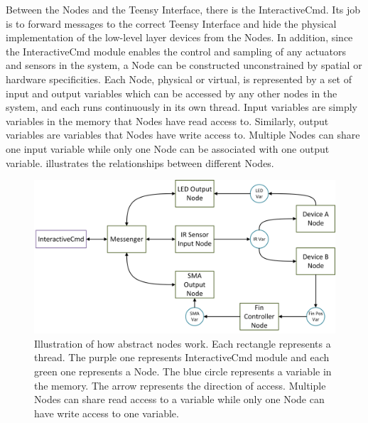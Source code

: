 Between the Nodes and the Teensy Interface, there is the InteractiveCmd. Its job is to forward messages to the correct Teensy Interface and hide the physical implementation of the low-level layer devices from the Nodes. In addition, since the InteractiveCmd module enables the control and sampling of any actuators and sensors in the system, a Node can be constructed unconstrained by spatial or hardware specificities. Each Node, physical or virtual, is represented by a set of input and output variables which can be accessed by any other nodes in the system, and each runs continuously in its own thread. Input variables are simply variables in the memory that Nodes have read access to. Similarly, output variables are variables that Nodes have write access to. Multiple Nodes can share one input variable while only one Node can be associated with one output variable.  illustrates the relationships between different Nodes. 

\begin{figure}[!htbp]
	\centering
	\includegraphics[width=1.0 \textwidth]{"fig/interactive control system/Node_abstraction"}
	\caption[Illustration of how abstract nodes work]{Illustration of how abstract nodes work. Each rectangle represents a thread. The purple one represents InteractiveCmd module and each green one represents a Node. The blue circle represents a variable in the memory. The arrow represents the direction of access. Multiple Nodes can share read access to a variable while only one Node can have write access to one variable.}
	\label{fig:Node_abstraction}
\end{figure}

